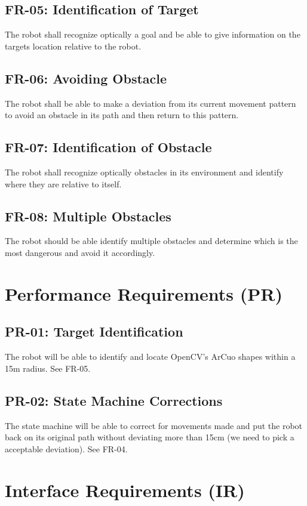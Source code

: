 \documentclass[]{report}
\begin{document}
\subsection{FR-05: Identification of Target}
The robot shall recognize optically a goal and be able to give information on the targets location relative to the robot. 

\subsection{FR-06: Avoiding Obstacle}
The robot shall be able to make a deviation from its current movement pattern to avoid an obstacle in its path and then return to this pattern.

\subsection{FR-07: Identification of Obstacle}
The robot shall recognize optically obstacles in its environment and identify where they are relative to itself.

\subsection{FR-08: Multiple Obstacles}
The robot should be able identify multiple obstacles and determine which is the most dangerous and avoid it accordingly. 


\section{Performance Requirements (PR)}

\subsection{PR-01: Target Identification}
The robot will be able to identify and locate OpenCV's ArCuo shapes within a 15m radius. See FR-05.

\subsection{PR-02: State Machine Corrections}
The state machine will be able to correct for movements made and put the robot back on its original path without deviating more than 15cm (we need to pick a acceptable deviation). See FR-04.


\section{Interface Requirements (IR)}
\end{document}
